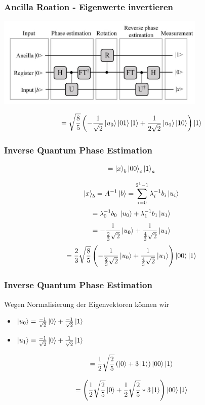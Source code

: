 \begin{frame}
    \frametitle{Ancilla Roation - Eigenwerte invertieren}
    \begin{center}
    \includegraphics[width=10cm]{img/hhl_circuit.jpg}
    \end{center}

    $$  =\sqrt{\frac{8}{5}}\left(-\frac{1}{\sqrt{2}} \ket{u_0}\ket{01}\ket{1} +\frac{1}{2\sqrt{2}} \ket{u_1} \ket{10}\right)\ket{1}$$
\end{frame}



\begin{frame}
    \frametitle{Inverse Quantum Phase Estimation}
$$ = \ket{x}_b \ket{00}_c \ket{1}_a $$

$$ \ket{x}_b =  A^{-1} \ket{b} = 
\sum_{i=0}^{2^{1}-1} 
\lambda_i^{-1} b_i\ket{u_i} $$
$$=\lambda_0^{-1} b_0\  \ket{u_0} +  \lambda_1^{-1} b_1\ket{u_1}$$
$$=-\frac{1}{\frac{2}{3}\sqrt{2}} \ket{u_0} +\frac{1}   {\frac{4}{3}\sqrt{2}}  \ket{u_1}$$
$$=\frac{2}{3}\sqrt{\frac{8}{5}} \left( -\frac{1}{\frac{2}{3}\sqrt{2}} \ket{u_0} +\frac{1}   {\frac{4}{3}\sqrt{2}}  \ket{u_1}\right)  \ket{00} \ket{1} $$

\end{frame}

\begin{frame}
    \frametitle{Inverse Quantum Phase Estimation}

Wegen Normalisierung der Eigenvektoren können wir 

\begin{itemize}
    \item $ \ket{u_0} = \frac{-1}{\sqrt{2}}\ket{0} + \frac{-1}{\sqrt{2}}\ket{1}$ 
    \item $ \ket{u_1}= \frac{-1}{\sqrt{2}}\ket{0} + \frac{1}{\sqrt{2}}\ket{1}$ 
\end{itemize}

$$ = \frac{1}{2}\sqrt{\frac{2}{5}} \left( \ket{0} + 3\ket{1} \right)  \ket{00} \ket{1} $$

$$ = \left(\frac{1}{2}\sqrt{\frac{2}{5}} \ket{0} +\frac{1}{2}\sqrt{\frac{2}{5}} * 3 \ket{1} \right) \ket{00} \ket{1} $$

\end{frame}


